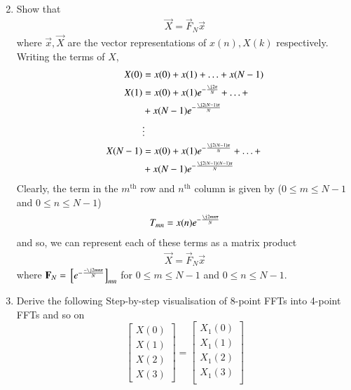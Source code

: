 \documentclass[journal,12pt,twocolumn]{IEEEtran}
\renewcommand\thesection{\arabic{section}}
\begin{document}
\begin{enumerate}[label=\arabic*.,ref=\thesection.\theenumi]
\begin{align}
	\label{eq:x-permute}
\end{align}
\item Show that 
    \begin{align}
	    \vec{X} = \vec{F}_N \vec{x}
	    \label{eq:dft-mat-def}
    \end{align}
		where $\vec{x}, \vec{X}$ are the vector representations of $x(n), X(k)$ respectively.
\solution Writing the terms of $X$, 
\begin{align}
	X(0) &= x(0) + x(1) + \ldots + x(N - 1) \\
	X(1) &= x(0) + x(1)e^{-\frac{\j2\pi}{N}} + \ldots + \nonumber \\
		 &+ x(N - 1)e^{-\frac{\j2(N - 1)\pi}{N}} \\
		 &\vdots \nonumber \\
	X(N - 1) &= x(0) + x(1)e^{-\frac{\j2(N - 1)\pi}{N}} + \ldots + \nonumber \\
			 &+ x(N - 1)e^{-\frac{\j2(N - 1)(N - 1)\pi}{N}}	
\end{align}
Clearly, the term in the $m^{\text{th}}$ row and $n^{\text{th}}$ column is given by ($0 \leq m \leq N - 1$ and $0 \leq n \leq N - 1$) 
\begin{align}
	T_{mn} = x(n)e^{-\frac{\j2mn\pi}{N}} 
\end{align}
and so, we can represent each of these terms as a matrix product
\begin{align}
	\vec{X} = \vec{F}_N\vec{x}
\end{align}
where $\vec{F}_N = \sbrak{e^{-\frac{-\j2mn\pi}{N}}}_{mn}$ for $0 \leq m \leq N - 1$ and $0 \leq n \leq N - 1$. 
\item Derive the following Step-by-step visualisation  of
8-point FFTs into 4-point FFTs and so on
\begin{equation}
\begin{bmatrix}
X(0) \\ 
X(1) \\ 
X(2) \\ 
X(3)
\end{bmatrix}
=
\begin{bmatrix}
X_{1}(0) \\ 
X_{1}(1)\\ 
X_{1}(2)\\
X_{1}(3)\\
\end{bmatrix}

\end{equation}
\end{enumerate}
\end{document}
